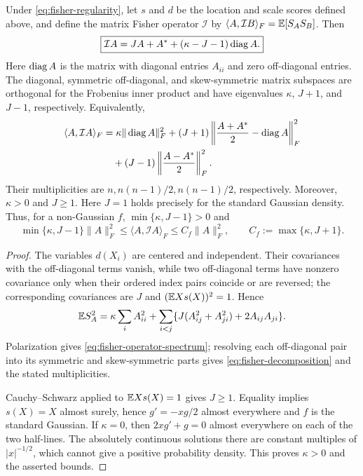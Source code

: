 \begin{theorem}
Under \eqref{eq:fisher-regularity}, let \(s\) and \(d\) be the location and
scale scores defined above, and define the matrix Fisher operator
$\mathcal I$ by
$\langle A,\mathcal I B\rangle_F=\mathbb E[S_AS_B]$.
Then
\begin{equation}
 \boxed{\mathcal I A=JA+A^*
                     +(\kappa-J-1)\operatorname{diag} A.}
 \label{eq:fisher-operator-spectrum}
\end{equation}
Here $\operatorname{diag} A$ is the matrix with diagonal entries $A_{ii}$ and zero
off-diagonal entries.  The diagonal, symmetric off-diagonal, and skew-symmetric matrix subspaces
are orthogonal for the Frobenius inner product and have eigenvalues
$\kappa$, $J+1$, and $J-1$, respectively.  Equivalently,
\begin{equation}
 \begin{aligned}
 \langle A,\mathcal I A\rangle_F
 &=\kappa\|\operatorname{diag} A\|_F^2
   +(J+1)\left\|\frac{A+A^*}2-\operatorname{diag} A\right\|_F^2\\
 &\quad +(J-1)\left\|\frac{A-A^*}2\right\|_F^2.
 \end{aligned}
 \label{eq:fisher-decomposition}
\end{equation}
Their multiplicities are \(n,n(n-1)/2,n(n-1)/2\), respectively.
Moreover, $\kappa>0$ and $J\ge1$.
Here $J=1$ holds precisely for the
standard Gaussian density.  Thus, for a non-Gaussian $f$,
$\min\{\kappa,J-1\}>0$ and
\begin{equation}
 \min\{\kappa,J-1\}\|A\|_F^2\le\langle A,\mathcal I A\rangle_F
 \le C_f\|A\|_F^2,\qquad
 C_f:=\max\{\kappa,J+1\}.
 \label{eq:fisher-ellipticity}
\end{equation}
\end{theorem}

\begin{proof}
The variables $d(X_i)$ are centered and independent.  Their covariances with
the off-diagonal terms vanish, while two off-diagonal terms have nonzero
covariance only when their ordered index pairs coincide or are reversed; the
corresponding covariances are $J$ and $(\mathbb E Xs(X))^2=1$.  Hence
\begin{equation}
 \mathbb E S_A^2
 =\kappa\sum_i A_{ii}^2+
   \sum_{i<j}\{J(A_{ij}^2+A_{ji}^2)+2A_{ij}A_{ji}\}.
\end{equation}
Polarization gives \eqref{eq:fisher-operator-spectrum}; resolving each
off-diagonal pair into its symmetric and skew-symmetric parts gives
\eqref{eq:fisher-decomposition} and the stated multiplicities.

Cauchy--Schwarz applied to $\mathbb E Xs(X)=1$ gives $J\ge1$.
Equality implies $s(X)=X$ almost surely, hence
$g'=-xg/2$ almost everywhere and $f$ is the standard Gaussian.
If $\kappa=0$, then $2xg'+g=0$ almost everywhere on each of the two
half-lines.  The absolutely continuous solutions there are constant
multiples of $|x|^{-1/2}$, which cannot give a positive probability
density.  This proves $\kappa>0$ and the asserted bounds.
\end{proof}

